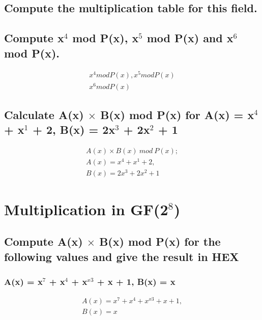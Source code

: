 \subsection{Compute the multiplication table for this field.}
\label{section:2b}

\subsection{Compute x$^{4}$ mod P(x), x$^{5}$ mod P(x) and x$^{6}$ mod P(x).}
\label{section:2c}
\begin{equation}
\begin{split}
x^{4} mod P(x), x^{5} mod P(x) \\ 
x^{6} mod P(x)
\end{split}
\end{equation}

\subsection{Calculate A(x) $\times$ B(x) mod P(x) for A(x) = x$^{4}$ + x$^{1}$ + 2, B(x) = 2x$^{3}$ + 2x$^{2}$ + 1}
\label{section:2d}
\begin{equation}
\begin{split}
A(x) \times B(x)~mod~P(x); \\
A(x) = x^{4} + x^{1} + 2, \\ 
B(x) = 2x^{3} + 2x^{2} + 1
\end{split}
\end{equation}

\section{Multiplication in GF(2$^{8}$)}

\subsection{Compute A(x) $\times$ B(x) mod P(x) for the following values and give the result in HEX}
\label{section:3a}

\subsubsection{A(x) = x$^{7}$ + x$^{4}$ + x$^{x3}$ + x + 1, B(x) = x }
\label{section:3aa}
\begin{equation}
\begin{split}
A(x) = x^{7} + x^{4} + x^{x3} + x + 1, \\
B(x) = x 
\end{split}
\end{equation}

